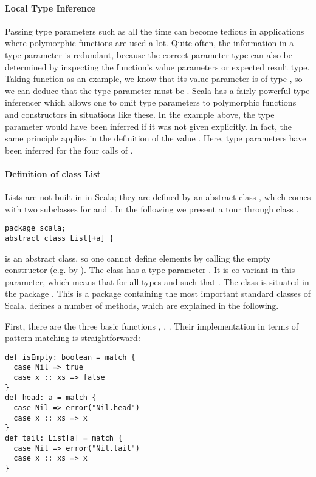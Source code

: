 \documentclass[a4paper,12pt,twoside,titlepage]{book}
\begin{document}
\paragraph{Local Type Inference}
Passing type parameters such as \code{[int]} all the time can become
tedious in applications where polymorphic functions are used a
lot. Quite often, the information in a type parameter is redundant,
because the correct parameter type can also be determined by
inspecting the function's value parameters or expected result type.
Taking  function as an example, we know that
its value parameter is of type , so we can
deduce that the type parameter must be . Scala has a
fairly powerful type inferencer which allows one to omit type
parameters to polymorphic functions and constructors in situations
like these.  In the example above, the  type parameter would
have been inferred if it was not given explicitly. In fact, the same
principle applies in the definition of the value . 
Here, type parameters have been inferred for the four calls of
. 

\paragraph{Definition of class List}

Lists are not built in in Scala; they are defined by an abstract class
, which comes with two subclasses for \code{::} and .
In the following we present a tour through class .
\begin{lstlisting}
package scala;
abstract class List[+a] {
\end{lstlisting}
 is an abstract class, so one cannot define elements by
calling the empty  constructor (e.g. by
).  The class has a type parameter . It is
co-variant in this parameter, which means that
 for all types  and  such that
.  The class is situated in the package
. This is a package containing the most important standard
classes of Scala.  defines a number of methods, which are
explained in the following.

First, there are the three basic functions , 
, . Their implementation in terms of pattern
matching is straightforward:
\begin{lstlisting}
def isEmpty: boolean = match {
  case Nil => true
  case x :: xs => false 
}   
def head: a = match { 
  case Nil => error("Nil.head") 
  case x :: xs => x 
}
def tail: List[a] = match { 
  case Nil => error("Nil.tail") 
  case x :: xs => x 
}
\end{lstlisting}
\end{document}
